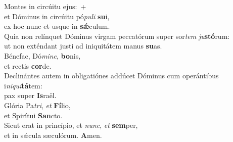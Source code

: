 \evenverse Montes in circúitu ejus:~+\\\evenverse  et Dóminus in circúitu pó\textit{pu}\textit{li} \textbf{su}i,~\*\\
\evenverse ex hoc nunc et usque in \textbf{sǽ}culum.\\
\oddverse Quia non relínquet Dóminus virgam peccatórum super sor\textit{tem} \textit{ju}\textbf{stó}rum:~\*\\
\oddverse ut non exténdant justi ad iniquitátem manus \textbf{su}as.\\
\evenverse Bénefac, Dó\textit{mi}\textit{ne}, \textbf{bo}nis,~\*\\
\evenverse et rectis \textbf{cor}de.\\
\oddverse Declinántes autem in obligatiónes addúcet Dóminus cum operántibus i\textit{ni}\textit{qui}\textbf{tá}tem:~\*\\
\oddverse pax super \textbf{Is}raël.\\
\evenverse Glória Pa\textit{tri}, \textit{et} \textbf{Fí}lio,~\*\\
\evenverse et Spirítui \textbf{San}cto.\\
\oddverse Sicut erat in princípio, et \textit{nunc}, \textit{et} \textbf{sem}per,~\*\\
\oddverse et in sǽcula sæculórum. \textbf{A}men.\\

